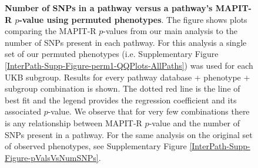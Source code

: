 \documentclass[12pt,a4paper]{article}
\def\log{{\rm log}}
\begin{document}
\addtocounter{figure}{-1}
\begin{figure} [t!]
  \caption{\textbf{Number of SNPs in a pathway versus a pathway's MAPIT-R $p$-value using permuted phenotypes}. The figure shows plots comparing the MAPIT-R $p$-values from our main analysis to the number of SNPs present in each pathway. For this analysis a single set of our permuted phenotypes (i.e. Supplementary Figure \ref{InterPath-Supp-Figure-perm1-QQPlots-AllPaths}) was used for each UKB subgroup. Results for every pathway database + phenotype + subgroup combination is shown. The dotted red line is the line of best fit and the legend provides the regression coefficient and its associated $p$-value. We observe that for very few combinations there is any relationship between MAPIT-R $p$-value and the number of SNPs present in a pathway. For the same analysis on the original set of observed phenotypes, see Supplementary Figure \ref{InterPath-Supp-Figure-pValsVsNumSNPs}.}
\label{InterPath-Supp-Figure-pValsVsNumSNPs-perm1-Caption}
\end{figure}
\clearpage


\end{document}
